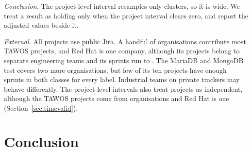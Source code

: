 \documentclass[journal]{IEEEtran}
\begin{document}
\emph{Conclusion.} The project-level interval resamples only \NProj{} clusters, so it is wide. We treat a result as holding only when the project interval clears zero, and report the adjusted values beside it.

\emph{External.} All projects use public Jira. A handful of organisations contribute most TAWOS projects, and Red Hat is one company, although its projects belong to separate engineering teams and its sprints run to \RHTo. The MariaDB and MongoDB test covers two more organisations, but few of its ten projects have enough sprints in both classes for every label. Industrial teams on private trackers may behave differently. The project-level intervals also treat projects as independent, although the TAWOS projects come from \TvOrgT{} organisations and Red Hat is one (Section~\ref{sec:timevalid}).

\section{Conclusion}
\end{document}
